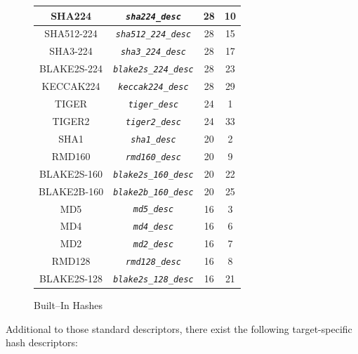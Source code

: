 \documentclass[synpaper]{book}
\newcommand{\code}[1]{\texttt{\textit{#1}}}
\begin{document}
\begin{figure}[H]
\begin{center}
\begin{tabular}{|c|c|c|c|}
\hline SHA224            & \code{sha224\_desc}              & 28 & 10 \\
\hline SHA512-224        & \code{sha512\_224\_desc}         & 28 & 15 \\
\hline SHA3-224          & \code{sha3\_224\_desc}           & 28 & 17 \\
\hline BLAKE2S-224       & \code{blake2s\_224\_desc}        & 28 & 23 \\
\hline KECCAK224         & \code{keccak224\_desc}           & 28 & 29 \\
\hline TIGER             & \code{tiger\_desc}               & 24 &  1 \\
\hline TIGER2            & \code{tiger2\_desc}              & 24 & 33 \\
\hline SHA1              & \code{sha1\_desc}                & 20 &  2 \\
\hline RMD160            & \code{rmd160\_desc}              & 20 &  9 \\
\hline BLAKE2S-160       & \code{blake2s\_160\_desc}        & 20 & 22 \\
\hline BLAKE2B-160       & \code{blake2b\_160\_desc}        & 20 & 25 \\
\hline MD5               & \code{md5\_desc}                 & 16 &  3 \\
\hline MD4               & \code{md4\_desc}                 & 16 &  6 \\
\hline MD2               & \code{md2\_desc}                 & 16 &  7 \\
\hline RMD128            & \code{rmd128\_desc}              & 16 &  8 \\
\hline BLAKE2S-128       & \code{blake2s\_128\_desc}        & 16 & 21 \\

\hline
\end{tabular}
\end{center}
\caption{Built--In Hashes}
\end{figure}

Additional to those standard descriptors, there exist the following target-specific hash descriptors:
\end{document}
